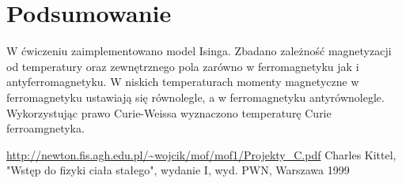 \documentclass[11pt]{article}
\begin{document}
\section*{Podsumowanie}

W ćwiczeniu zaimplementowano model Isinga. Zbadano zależność magnetyzacji 
od temperatury oraz zewnętrznego pola zarówno w ferromagnetyku jak i antyferromagnetyku.
W niskich temperaturach momenty magnetyczne w ferromagnetyku ustawiają się równolegle, a
w ferromagnetyku antyrównolegle. Wykorzystując prawo Curie-Weissa wyznaczono temperaturę 
Curie ferroamgnetyka. 

\begin{thebibliography}{9}
    \url{http://newton.fis.agh.edu.pl/~wojcik/mof/mof1/Projekty_C.pdf}
    Charles Kittel, "Wstęp do fizyki ciała stałego", wydanie I, wyd. PWN, Warszawa 1999
\end{thebibliography}
\end{document}

